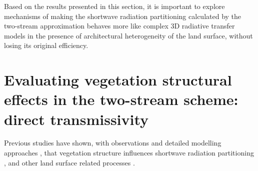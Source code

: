 \documentclass[a4paper,11pt]{report}
\begin{document}
Based on the results presented in this section, it is important to explore mechanisms of making the shortwave radiation partitioning calculated by the two-stream approximation behaves more like complex 3D radiative transfer models in the presence of architectural heterogeneity of the land surface, without losing its original efficiency.

\section{Evaluating vegetation structural effects in the two-stream scheme: direct transmissivity}\label{section:parameterisations}

Previous studies \citep{Nilson1971,Wang1990} have shown, with observations \citep{Kucharik1999,Yang2001,yang2003,Jonckheere2004} and detailed modelling approaches \citep{Ni-Meister2010,Widlowski2011}, that vegetation structure influences shortwave radiation partitioning \citep{pinty2006,Chen2008}, and other land surface related processes \citep{Kobayashi2012,loew2014}.



\end{document}
